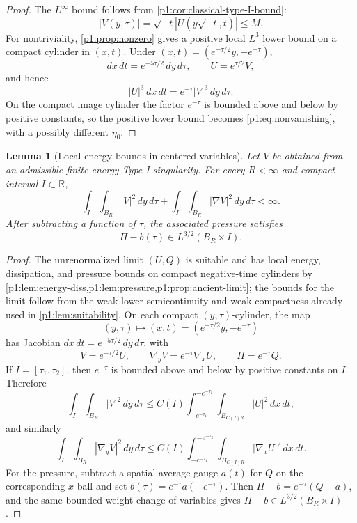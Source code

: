 \documentclass[11pt]{amsart}
\theoremstyle{plain}
\newtheorem{lemma}[lemma]{Lemma}
\theoremstyle{definition}
\theoremstyle{remark}
\numberwithin{equation}{section}
\newcommand{\R}{\mathbb R}
\begin{document}
\begin{proof}
The \(L^\infty\) bound follows from \cref{p1:cor:classical-type-I-bound}:
\[
   |V(y,\tau)|=\sqrt{-t}|U(y\sqrt{-t},t)|\le M.
\]
For nontriviality, \cref{p1:prop:nonzero} gives a positive local \(L^3\) lower bound
on a compact cylinder in \((x,t)\).  Under
\((x,t)=(e^{-\tau/2}y,-e^{-\tau})\),
\[
   dx\,dt=e^{-5\tau/2}\,dy\,d\tau,\qquad
   U=e^{\tau/2}V,
\]
and hence
\[
   |U|^3\,dx\,dt=e^{-\tau}|V|^3\,dy\,d\tau .
\]
On the compact image cylinder the factor \(e^{-\tau}\) is bounded above and
below by positive constants, so the positive lower bound becomes
\eqref{p1:eq:nonvanishing}, with a possibly different \(\eta_0\).
\end{proof}

\begin{lemma}[Local energy bounds in centered variables]
\label{p1:lem:centered-local-energy}
Let \(V\) be obtained from an admissible finite-energy Type I singularity.  For every
\(R<\infty\) and
compact interval \(I\subset\R\),
\[
   \int_I\int_{B_R}|V|^2\,dy\,d\tau
   +
   \int_I\int_{B_R}|\nabla V|^2\,dy\,d\tau<\infty .
\]
After subtracting a function of \(\tau\), the associated pressure satisfies
\[
   \Pi-b(\tau)\in L^{3/2}(B_R\times I).
\]
\end{lemma}

\begin{proof}
The unrenormalized limit \((U,Q)\) is suitable and has local energy,
dissipation, and pressure bounds on compact negative-time cylinders by
\cref{p1:lem:energy-diss,p1:lem:pressure,p1:prop:ancient-limit}; the bounds for the
limit follow from the weak lower semicontinuity and weak compactness already
used in \cref{p1:lem:suitability}.  On each compact
\((y,\tau)\)-cylinder, the map
\[
   (y,\tau)\mapsto (x,t)=(e^{-\tau/2}y,-e^{-\tau})
\]
has Jacobian \(dx\,dt=e^{-5\tau/2}\,dy\,d\tau\), with
\[
   V=e^{-\tau/2}U,\qquad
   \nabla_yV=e^{-\tau}\nabla_xU,\qquad
   \Pi=e^{-\tau}Q .
\]
If \(I=[\tau_1,\tau_2]\), then \(e^{-\tau}\) is bounded above and below by
positive constants on \(I\).  Therefore
\[
   \int_I\int_{B_R}|V|^2\,dy\,d\tau
   \le C(I)\int_{-e^{-\tau_1}}^{-e^{-\tau_2}}
       \int_{B_{C(I)R}}|U|^2\,dx\,dt,
\]
and similarly
\[
   \int_I\int_{B_R}|\nabla_yV|^2\,dy\,d\tau
   \le C(I)\int_{-e^{-\tau_1}}^{-e^{-\tau_2}}
       \int_{B_{C(I)R}}|\nabla_xU|^2\,dx\,dt.
\]
For the pressure, subtract a spatial-average gauge \(a(t)\) for \(Q\) on the
corresponding \(x\)-ball and set \(b(\tau)=e^{-\tau}a(-e^{-\tau})\).  Then
\(\Pi-b=e^{-\tau}(Q-a)\), and the same bounded-weight change of variables
gives \(\Pi-b\in L^{3/2}(B_R\times I)\).
\end{proof}
\end{document}
